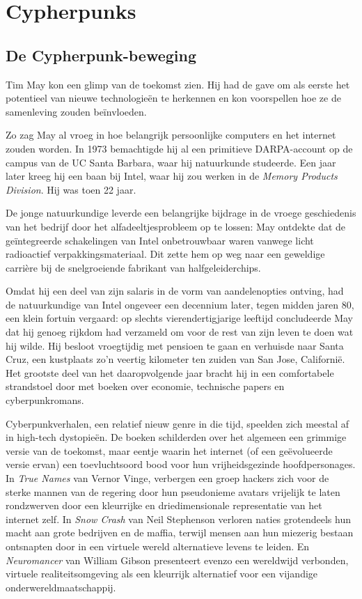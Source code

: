 \documentclass[
  a5paper,
  smalldemyvopaper,11pt,twoside,onecolumn,openright,extrafontsizes,
hidelinks]{memoir}
\begin{document}
\part{Cypherpunks}

\chapter{De Cypherpunk-beweging}\label{de-cypherpunk-beweging}

Tim May kon een glimp van de toekomst zien. Hij had de gave om als
eerste het potentieel van nieuwe technologieën te herkennen en kon
voorspellen hoe ze de samenleving zouden beïnvloeden.

Zo zag May al vroeg in hoe belangrijk persoonlijke computers en het
internet zouden worden. In 1973 bemachtigde hij al een primitieve
DARPA-account op de campus van de UC Santa Barbara, waar hij natuurkunde
studeerde. Een jaar later kreeg hij een baan bij Intel, waar hij zou
werken in de \emph{Memory Products Division}. Hij was toen 22 jaar.

De jonge natuurkundige leverde een belangrijke bijdrage in de vroege
geschiedenis van het bedrijf door het alfadeeltjesprobleem op te lossen:
May ontdekte dat de geïntegreerde schakelingen van Intel onbetrouwbaar
waren vanwege licht radioactief verpakkingsmateriaal. Dit zette hem op
weg naar een geweldige carrière bij de snelgroeiende fabrikant van
halfgeleiderchips.

Omdat hij een deel van zijn salaris in de vorm van aandelenopties
ontving, had de natuurkundige van Intel ongeveer een decennium later,
tegen midden jaren 80, een klein fortuin vergaard: op slechts
vierendertigjarige leeftijd concludeerde May dat hij genoeg rijkdom had
verzameld om voor de rest van zijn leven te doen wat hij wilde. Hij
besloot vroegtijdig met pensioen te gaan en verhuisde naar Santa Cruz,
een kustplaats zo'n veertig kilometer ten zuiden van San Jose,
Californië. Het grootste deel van het daaropvolgende jaar bracht hij in
een comfortabele strandstoel door met boeken over economie, technische
papers en cyberpunkromans.

Cyberpunkverhalen, een relatief nieuw genre in die tijd, speelden zich
meestal af in high-tech dystopieën. De boeken schilderden over het
algemeen een grimmige versie van de toekomst, maar eentje waarin het
internet (of een geëvolueerde versie ervan) een toevluchtsoord bood voor
hun vrijheidsgezinde hoofdpersonages. In \emph{True Names} van Vernor
Vinge, verbergen een groep hackers zich voor de sterke mannen van de
regering door hun pseudonieme avatars vrijelijk te laten rondzwerven
door een kleurrijke en driedimensionale representatie van het internet
zelf. In \emph{Snow Crash} van Neil Stephenson verloren naties
grotendeels hun macht aan grote bedrijven en de maffia, terwijl mensen
aan hun miezerig bestaan ontsnapten door in een virtuele wereld
alternatieve levens te leiden. En \emph{Neuromancer} van William Gibson
presenteert evenzo een wereldwijd verbonden, virtuele realiteitsomgeving
als een kleurrijk alternatief voor een vijandige
onderwereldmaatschappij.
\end{document}
